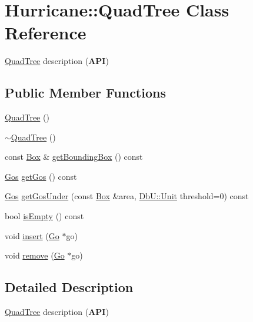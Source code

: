 \hypertarget{classHurricane_1_1QuadTree}{}\section{Hurricane\+:\+:Quad\+Tree Class Reference}
\label{classHurricane_1_1QuadTree}


\mbox{\hyperlink{classHurricane_1_1QuadTree}{Quad\+Tree}} description ({\bfseries A\+PI})  


\subsection*{Public Member Functions}
\begin{DoxyCompactItemize}
\item 
\mbox{\hyperlink{classHurricane_1_1QuadTree_a91303ebe7740d87429c74205181ac702}{Quad\+Tree}} ()
\item 
\mbox{\hyperlink{classHurricane_1_1QuadTree_a3f0c6d7849185a9881bdb3b022fe1777}{$\sim$\+Quad\+Tree}} ()
\item 
const \mbox{\hyperlink{classHurricane_1_1Box}{Box}} \& \mbox{\hyperlink{classHurricane_1_1QuadTree_a80806e2d7e99fee07d0335697ed9b82b}{get\+Bounding\+Box}} () const
\item 
\mbox{\hyperlink{namespaceHurricane_a4456a34f3bc6766d471c3064ace19759}{Gos}} \mbox{\hyperlink{classHurricane_1_1QuadTree_a571dd774ee953dfebb3d4162f98c679c}{get\+Gos}} () const
\item 
\mbox{\hyperlink{namespaceHurricane_a4456a34f3bc6766d471c3064ace19759}{Gos}} \mbox{\hyperlink{classHurricane_1_1QuadTree_a6b4aa294b89c3f6b5f49388dbb985ff7}{get\+Gos\+Under}} (const \mbox{\hyperlink{classHurricane_1_1Box}{Box}} \&area, \mbox{\hyperlink{group__DbUGroup_ga4fbfa3e8c89347af76c9628ea06c4146}{Db\+U\+::\+Unit}} threshold=0) const
\item 
bool \mbox{\hyperlink{classHurricane_1_1QuadTree_a9d942a3c16a775a9ea576ef7dc753ac9}{is\+Empty}} () const
\item 
void \mbox{\hyperlink{classHurricane_1_1QuadTree_ac39f6a095f3b4148b36b92d2b0906f16}{insert}} (\mbox{\hyperlink{classHurricane_1_1Go}{Go}} $\ast$go)
\item 
void \mbox{\hyperlink{classHurricane_1_1QuadTree_af646d2864c70f6456d845c2d6a8d1785}{remove}} (\mbox{\hyperlink{classHurricane_1_1Go}{Go}} $\ast$go)
\end{DoxyCompactItemize}


\subsection{Detailed Description}
\mbox{\hyperlink{classHurricane_1_1QuadTree}{Quad\+Tree}} description ({\bfseries A\+PI}) 


